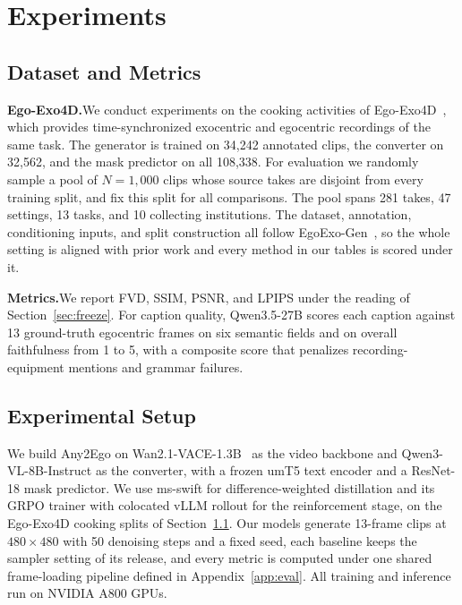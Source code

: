 \documentclass{article}
\begin{document}
\section{Experiments}
\label{sec:exp}

\subsection{Dataset and Metrics}
\label{sec:data}

\textbf{Ego-Exo4D.}\quad We conduct experiments on the cooking activities of
Ego-Exo4D~\citep{grauman2024egoexo4d}, which provides time-synchronized
exocentric and egocentric recordings of the same task. The generator is trained
on 34{,}242 annotated clips, the converter on 32{,}562, and the mask predictor on
all 108{,}338. For evaluation we randomly sample a pool of $N{=}1{,}000$ clips
whose source takes are disjoint from every training split, and fix this
split for all comparisons. The pool spans 281 takes, 47 settings, 13 tasks,
and 10 collecting institutions. The dataset, annotation, conditioning inputs, and split
construction all follow EgoExo-Gen~\citep{xu2025egoexogen}, so the whole setting
is aligned with prior work and every method in our tables is scored under it.

\textbf{Metrics.}\quad We report FVD, SSIM, PSNR, and LPIPS under the reading of
Section~\ref{sec:freeze}. For caption quality, Qwen3.5-27B scores each caption
against 13 ground-truth egocentric frames on six semantic fields and on overall
faithfulness from 1 to 5, with a composite score that penalizes
recording-equipment mentions and grammar failures.

\subsection{Experimental Setup}
\label{sec:setup}

We build Any2Ego on Wan2.1-VACE-1.3B~\citep{wan2025,vace2025} as the video
backbone and Qwen3-VL-8B-Instruct as the converter, with a frozen umT5 text
encoder and a ResNet-18 mask predictor. We use ms-swift for difference-weighted
distillation and its GRPO trainer with colocated vLLM rollout for the
reinforcement stage, on the Ego-Exo4D cooking splits of
Section~\ref{sec:data}. Our models generate 13-frame clips at
$480\times480$ with 50 denoising steps and a fixed seed, each baseline keeps the
sampler setting of its release, and every metric is computed under one shared
frame-loading pipeline defined in Appendix~\ref{app:eval}. All training and
inference run on NVIDIA A800 GPUs.
\end{document}
